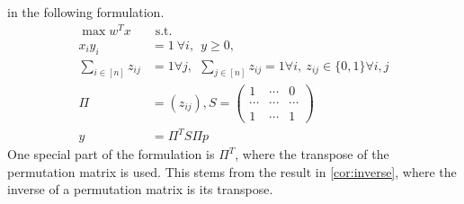 \documentclass[12pt,letterpaper]{article}
\begin{document}
in the following formulation.
\begin{align*}
    \max w^Tx& \text{ s.t. } \label{eq:D} \tag{C} \\
 x_i y_i &= 1 \ \forall i, \ \ y \geq 0, \\ 
    \sum_{i \in [n]} z_{ij} &= 1 \forall j,  \ \ 
    \sum_{j \in [n]} z_{ij} = 1 \forall i,  \ z_{ij} \in \{0, 1\} \forall i, j \\ 
    \Pi &= (z_{ij}), S = \begin{pmatrix}
        1 & \cdots & 0 \\ 
        \cdots & \cdots & \cdots \\ 
        1 & \cdots & 1
    \end{pmatrix} \\
 y &= \Pi^T S \Pi p 
\end{align*}
One special part of the formulation is $\Pi^T$, where the transpose 
of the permutation matrix is used. This stems from the result in \ref{cor:inverse},
where the inverse of a permutation matrix is its transpose.
\end{document}
